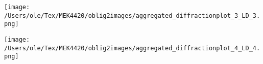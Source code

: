 \vspace{0.5cm} %

\noindent
\begin{minipage}[t]{0.45\linewidth}
    \texttt{[image: /Users/ole/Tex/MEK4420/oblig2images/aggregated\_diffractionplot\_3\_LD\_3.png]}
    \label{fig:a22_3}
\end{minipage}
\hspace{0.05\linewidth}
\begin{minipage}[t]{0.45\linewidth}
    \texttt{[image: /Users/ole/Tex/MEK4420/oblig2images/aggregated\_diffractionplot\_4\_LD\_4.png]}
    \label{fig:a22_4}
\end{minipage} 



